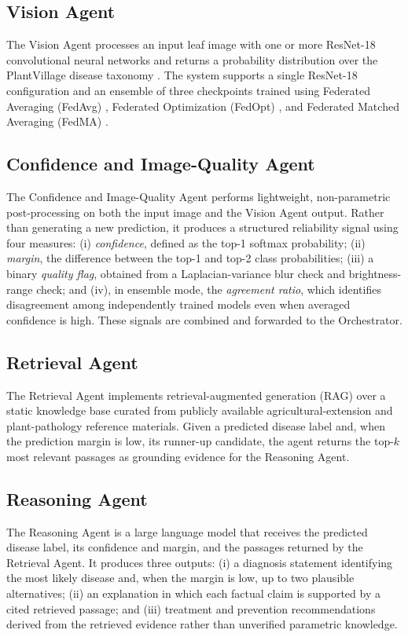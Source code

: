 \documentclass[conference]{IEEEtran}
\begin{document}
\subsection{Vision Agent}
The Vision Agent processes an input leaf image with one or more ResNet-18 convolutional neural networks and returns a probability distribution over the PlantVillage disease taxonomy \cite{r_hughes2015,r_he2016}. The system supports a single ResNet-18 configuration and an ensemble of three checkpoints trained using Federated Averaging (FedAvg) \cite{r_fedavg}, Federated Optimization (FedOpt) \cite{r_fedopt}, and Federated Matched Averaging (FedMA) \cite{r_fedma}. 

\subsection{Confidence and Image-Quality Agent}
The Confidence and Image-Quality Agent performs lightweight, non-parametric post-processing on both the input image and the Vision Agent output. Rather than generating a new prediction, it produces a structured reliability signal using four measures: (i) \emph{confidence}, defined as the top-1 softmax probability; (ii) \emph{margin}, the difference between the top-1 and top-2 class probabilities; (iii) a binary \emph{quality flag}, obtained from a Laplacian-variance blur check and brightness-range check; and (iv), in ensemble mode, the \emph{agreement ratio}, which identifies disagreement among independently trained models even when averaged confidence is high. These signals are combined and forwarded to the Orchestrator.

\subsection{Retrieval Agent}
The Retrieval Agent implements retrieval-augmented generation (RAG) \cite{r_lewis2020} over a static knowledge base curated from publicly available agricultural-extension and plant-pathology reference materials. Given a predicted disease label and, when the prediction margin is low, its runner-up candidate, the agent returns the top-$k$ most relevant passages as grounding evidence for the Reasoning Agent.

\subsection{Reasoning Agent}
The Reasoning Agent is a large language model that receives the predicted disease label, its confidence and margin, and the passages returned by the Retrieval Agent. It produces three outputs: (i) a diagnosis statement identifying the most likely disease and, when the margin is low, up to two plausible alternatives; (ii) an explanation in which each factual claim is supported by a cited retrieved passage; and (iii) treatment and prevention recommendations derived from the retrieved evidence rather than unverified parametric knowledge.
\end{document}

